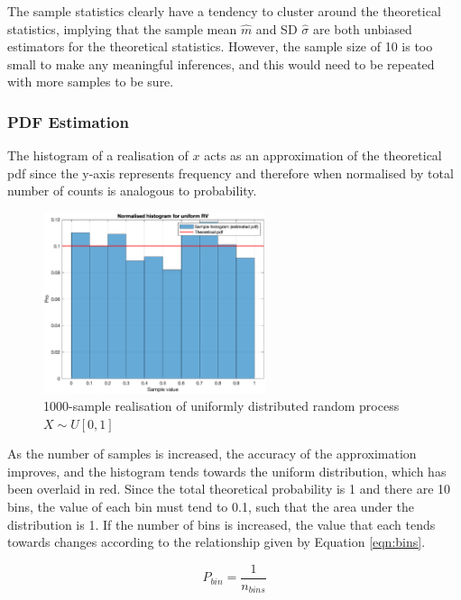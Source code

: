 \noindent
The sample statistics clearly have a tendency to cluster around the theoretical statistics, implying that the sample mean $\hat{m}$ and SD $\hat{\sigma}$ are both unbiased estimators for the theoretical statistics. However, the sample size of 10 is too small to make any meaningful inferences, and this would need to be repeated with more samples to be sure.

\subsubsection{PDF Estimation}
The histogram of a realisation of $x$ acts as an approximation of the theoretical pdf since the y-axis represents frequency and therefore when normalised by total number of counts is analogous to probability.

\begin{figure}[H]
    \centering
    \includegraphics[width=6.5cm]{assignment1figs/unihist.eps}
    \caption{1000-sample realisation of uniformly distributed random process $X \sim \textit{U}[0,1]$}
    \label{fig:unihist}
\end{figure}

\noindent
As the number of samples is increased, the accuracy of the approximation improves, and the histogram tends towards the uniform distribution, which has been overlaid in red. Since the total theoretical probability is 1 and there are 10 bins, the value of each bin must tend to 0.1, such that the area under the distribution is 1. If the number of bins is increased, the value that each tends towards changes according to the relationship given by Equation \ref{eqn:bins}.

\begin{equation}
    P_{bin} = \frac{1}{n_{bins}}
    \label{eqn:bins}
\end{equation}

